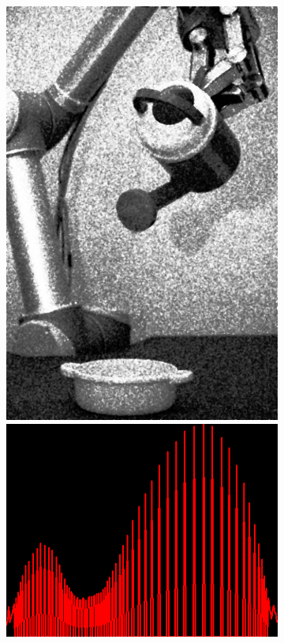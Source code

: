 \begin{figure}[H]
    \begin{subfigure}[b]{0.28\textwidth}
        \includegraphics[width=\textwidth]{img2/eqlMedian.png}\\[0.1cm]
        \includegraphics[width=\textwidth]{img2/hist_eee_eql_res_total.png}

\end{subfigure}
\end{figure}
